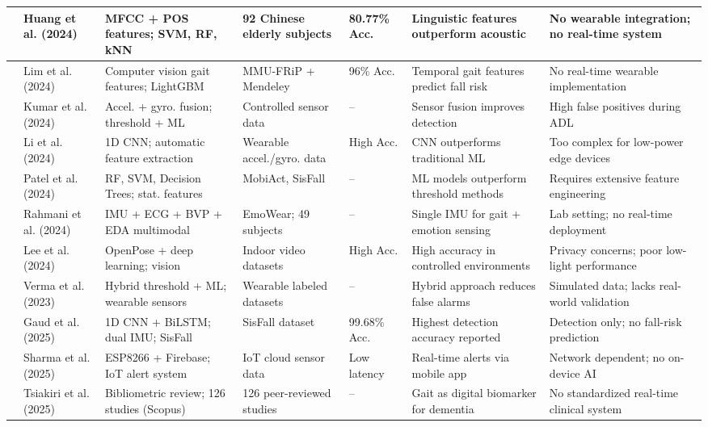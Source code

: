 \documentclass[conference]{IEEEtran}
\begin{document}
\begin{table}[!t]
\begin{tabular}{|p{0.6cm}|p{1.8cm}|p{2.2cm}|p{1.8cm}|p{1.0cm}|p{2.5cm}|p{2.8cm}|}
\hline
\cite{b26} & Huang et al. (2024) & MFCC + POS features; SVM, RF, kNN & 92 Chinese elderly subjects & 80.77\% Acc. & Linguistic features outperform acoustic & No wearable integration; no real-time system \\
\hline
\cite{b17} & Lim et al. (2024) & Computer vision gait features; LightGBM & MMU-FRiP + Mendeley & 96\% Acc. & Temporal gait features predict fall risk & No real-time wearable implementation \\
\hline
\cite{b4} & Kumar et al. (2024) & Accel. + gyro. fusion; threshold + ML & Controlled sensor data & -- & Sensor fusion improves detection & High false positives during ADL \\
\hline
\cite{b33} & Li et al. (2024) & 1D CNN; automatic feature extraction & Wearable accel./gyro. data & High Acc. & CNN outperforms traditional ML & Too complex for low-power edge devices \\
\hline
\cite{b34} & Patel et al. (2024) & RF, SVM, Decision Trees; stat. features & MobiAct, SisFall & -- & ML models outperform threshold methods & Requires extensive feature engineering \\
\hline
\cite{b12} & Rahmani et al. (2024) & IMU + ECG + BVP + EDA multimodal & EmoWear; 49 subjects & -- & Single IMU for gait + emotion sensing & Lab setting; no real-time deployment \\
\hline
\cite{b36} & Lee et al. (2024) & OpenPose + deep learning; vision & Indoor video datasets & High Acc. & High accuracy in controlled environments & Privacy concerns; poor low-light performance \\
\hline
\cite{b37} & Verma et al. (2023) & Hybrid threshold + ML; wearable sensors & Wearable labeled datasets & -- & Hybrid approach reduces false alarms & Simulated data; lacks real-world validation \\
\hline
\cite{b13} & Gaud et al. (2025) & 1D CNN + BiLSTM; dual IMU; SisFall & SisFall dataset & 99.68\% Acc. & Highest detection accuracy reported & Detection only; no fall-risk prediction \\
\hline
\cite{b35} & Sharma et al. (2025) & ESP8266 + Firebase; IoT alert system & IoT cloud sensor data & Low latency & Real-time alerts via mobile app & Network dependent; no on-device AI \\
\hline
\cite{b18} & Tsiakiri et al. (2025) & Bibliometric review; 126 studies (Scopus) & 126 peer-reviewed studies & -- & Gait as digital biomarker for dementia & No standardized real-time clinical system \\

\end{tabular}
\end{table}
\end{document}
